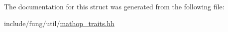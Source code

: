 The documentation for this struct was generated from the following file\-:\begin{DoxyCompactItemize}
\item 
include/fung/util/\hyperlink{mathop__traits_8hh}{mathop\-\_\-traits.\-hh}\end{DoxyCompactItemize}
